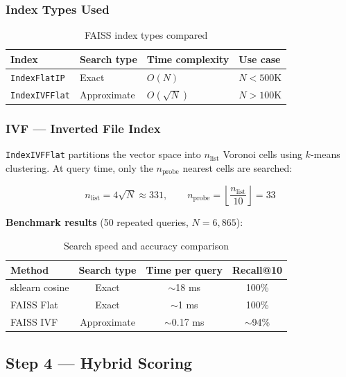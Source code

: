 \documentclass[12pt,a4paper]{article}
\begin{document}
\subsubsection{Index Types Used}

\begin{table}[H]
  \centering
  \begin{tabular}{llll}
    \toprule
    Index & Search type & Time complexity & Use case \\
    \midrule
    \texttt{IndexFlatIP}  & Exact    & $O(N)$           & $N < 500$K \\
    \texttt{IndexIVFFlat} & Approximate & $O(\sqrt{N})$ & $N > 100$K \\
    \bottomrule
  \end{tabular}
  \caption{FAISS index types compared}
\end{table}

\subsubsection{IVF — Inverted File Index}

\texttt{IndexIVFFlat} partitions the vector space into $n_{\text{list}}$
Voronoi cells using $k$-means clustering. At query time, only the
$n_{\text{probe}}$ nearest cells are searched:

\begin{equation}
  n_{\text{list}} = 4\sqrt{N} \approx 331, \qquad
  n_{\text{probe}} = \left\lfloor \frac{n_{\text{list}}}{10} \right\rfloor = 33
\end{equation}

\noindent \textbf{Benchmark results} (50 repeated queries, $N = 6{,}865$):

\begin{table}[H]
  \centering
  \begin{tabular}{lccc}
    \toprule
    Method & Search type & Time per query & Recall@10 \\
    \midrule
    sklearn cosine & Exact & $\sim$18 ms & 100\% \\
    FAISS Flat     & Exact & $\sim$1 ms  & 100\% \\
    FAISS IVF      & Approximate & $\sim$0.17 ms & $\sim$94\% \\
    \bottomrule
  \end{tabular}
  \caption{Search speed and accuracy comparison}
\end{table}

\subsection{Step 4 — Hybrid Scoring}
\label{sec:hybrid}
\end{document}
